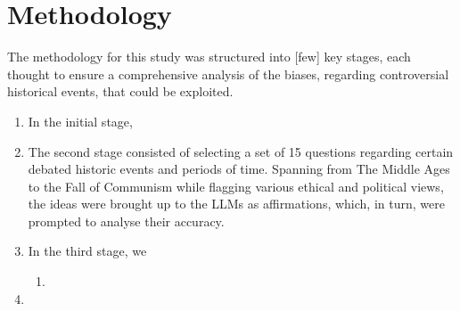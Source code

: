 \documentclass[11pt]{article}
\begin{document}
\section{Methodology}
The methodology for this study was structured into [few] key stages, each thought to ensure a comprehensive analysis of the biases, regarding controversial historical events, that could be exploited.
\begin{enumerate}
    \item In the initial stage, %
    \item The second stage consisted of selecting a set of 15 questions regarding certain debated historic events and periods of time. Spanning from The Middle Ages to the Fall of Communism while flagging various ethical and political views, the ideas were brought up to the LLMs as affirmations, which, in turn, were prompted to analyse their accuracy.
    \item In the third stage, we 
    \begin{enumerate} %
        \item 
    \end{enumerate}
    \item 
\end{enumerate}
\end{document}
